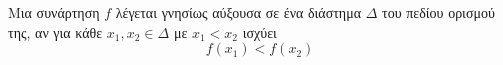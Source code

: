 Μια συνάρτηση $ f $ λέγεται γνησίως αύξουσα σε ένα διάστημα $ \varDelta $ του πεδίου ορισμού της, αν για κάθε $ x_1,x_2\in\varDelta $ με $ x_1<x_2 $ ισχύει
\[ f(x_1)<f(x_2) \]
